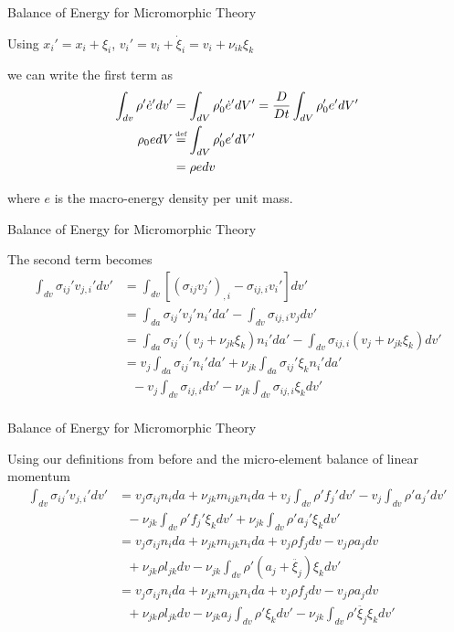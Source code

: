 \documentclass[11pt]{beamer}
\newcommand\defeq{\mathrel{\stackrel{\makebox[0pt]{\mbox{\normalfont\tiny def}}}{=}}}
\begin{document}
\begin{frame}{Balance of Energy for Micromorphic Theory}

Using $x_i' = x_i + \xi_i$, $v_i' = v_i + \dot{\xi}_i = v_i + \nu_{ik} \xi_k$

we can write the first term as
\begin{align*}
\int_{dv} \rho' \dot{e}' dv' &= \int_{dV} \rho_0' \dot{e}' dV' = \frac{D}{Dt} \int_{dV} \rho_0' e' dV'\\
\rho_0 e dV &\defeq \int_{dV} \rho_0' e' dV'\\
&= \rho e dv\\
\end{align*}

where $e$ is the macro-energy density per unit mass.

\end{frame}

\begin{frame}{Balance of Energy for Micromorphic Theory}

The second term becomes
\begin{align*}
\int_{dv} \sigma_{ij}' v_{j,i}' dv' &= \int_{dv}\left[ \left(\sigma_{ij} v_j'\right)_{,i} - \sigma_{ij,i} v_i' \right] dv'\\
&= \int_{da} \sigma_{ij}' v_j' n_i' da' - \int_{dv} \sigma_{ij,i} v_j dv'\\
&= \int_{da} \sigma_{ij}' \left(v_j + \nu_{jk}\xi_k\right) n_i' da' - \int_{dv} \sigma_{ij,i} \left(v_j + \nu_{jk}\xi_k\right) dv'\\
&= v_j \int_{da} \sigma_{ij}' n_i' da' + \nu_{jk}\int_{da} \sigma_{ij}' \xi_k n_i' da'\\
&\ \ \  - v_j\int_{dv} \sigma_{ij,i} dv' - \nu_{jk}\int_{dv} \sigma_{ij,i} \xi_k dv'\\
\end{align*}

\end{frame}

\begin{frame}{Balance of Energy for Micromorphic Theory}

Using our definitions from before and the micro-element balance of linear momentum
\begin{align*}
\int_{dv} \sigma_{ij}' v_{j,i}' dv' &= v_j \sigma_{ij} n_i da + \nu_{jk} m_{ijk} n_i da + v_j\int_{dv} \rho' f_j' dv' - v_j \int_{dv} \rho' a_j' dv'\\
&\ \ \   - \nu_{jk}\int_{dv} \rho'f_j' \xi_k dv' + \nu_{jk} \int_{dv} \rho' a_j' \xi_k dv'\\
&= v_j \sigma_{ij} n_i da + \nu_{jk} m_{ijk} n_i da+ v_j \rho f_j dv - v_j \rho a_j dv\\
&\ \ \   + \nu_{jk} \rho l_{jk} dv - \nu_{jk} \int_{dv} \rho'\left(a_j + \ddot{\xi_j}\right) \xi_k dv'\\
&= v_j \sigma_{ij} n_i da + \nu_{jk} m_{ijk} n_i da+ v_j \rho f_j dv - v_j \rho a_j dv\\
&\ \ \   + \nu_{jk} \rho l_{jk} dv - \nu_{jk}a_j \int_{dv}\rho' \xi_k dv' - \nu_{jk}\int_{dv} \rho'\ddot{\xi_j} \xi_k dv'\\
\end{align*}

\end{frame}
\end{document}
